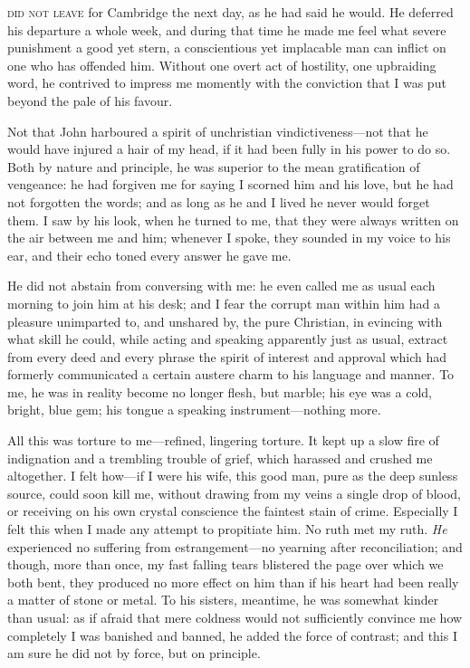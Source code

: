 
 \textsc{did not leave} for Cambridge the next day, as he had said he would. 
He deferred his departure a whole week, and during that time he made me
feel what severe punishment a good yet stern, a conscientious yet
implacable man can inflict on one who has offended him. Without one
overt act of hostility, one upbraiding word, he contrived to impress me
momently with the conviction that I was put beyond the pale of his
favour.

Not that \St{} John harboured a spirit of unchristian vindictiveness---not
that he would have injured a hair of my head, if it had been fully in
his power to do so. Both by nature and principle, he was superior to
the mean gratification of vengeance: he had forgiven me for saying I
scorned him and his love, but he had not forgotten the words; and as
long as he and I lived he never would forget them. I saw by his look,
when he turned to me, that they were always written on the air between
me and him; whenever I spoke, they sounded in my voice to his ear, and
their echo toned every answer he gave me.

He did not abstain from conversing with me: he even called me as usual
each morning to join him at his desk; and I fear the corrupt man within
him had a pleasure unimparted to, and unshared by, the pure Christian,
in evincing with what skill he could, while acting and speaking
apparently just as usual, extract from every deed and every phrase the
spirit of interest and approval which had formerly communicated a
certain austere charm to his language and manner. To me, he was in
reality become no longer flesh, but marble; his eye was a cold, bright,
blue gem; his tongue a speaking instrument---nothing more.

All this was torture to me---refined, lingering torture. It kept up a
slow fire of indignation and a trembling trouble of grief, which
harassed and crushed me altogether. I felt how---if I were his wife,
this good man, pure as the deep sunless source, could soon kill me,
without drawing from my veins a single drop of blood, or receiving on
his own crystal conscience the faintest stain of crime. Especially I
felt this when I made any attempt to propitiate him. No ruth met my
ruth. \emph{He} experienced no suffering from estrangement---no
yearning after reconciliation; and though, more than once, my fast
falling tears blistered the page over which we both bent, they produced
no more effect on him than if his heart had been really a matter of
stone or metal. To his sisters, meantime, he was somewhat kinder than
usual: as if afraid that mere coldness would not sufficiently convince
me how completely I was banished and banned, he added the force of
contrast; and this I am sure he did not by force, but on principle.

